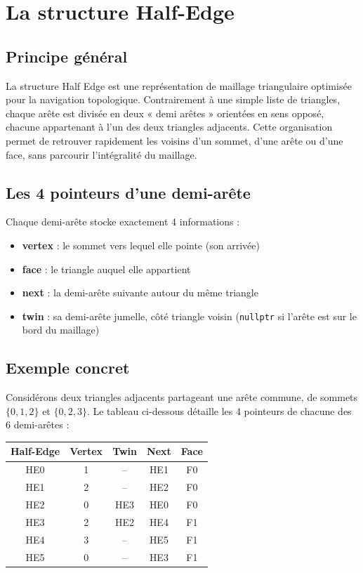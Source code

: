 \section{La structure Half-Edge}
\label{sec:halfedge}

\subsection{Principe général}
La structure Half Edge est une représentation de maillage triangulaire
optimisée pour la navigation topologique. Contrairement à une simple liste
de triangles, chaque arête est divisée en deux « demi arêtes » orientées
en sens opposé, chacune appartenant à l'un des deux triangles adjacents.
Cette organisation permet de retrouver rapidement les voisins d'un sommet,
d'une arête ou d'une face, sans parcourir l'intégralité du maillage.

\subsection{Les 4 pointeurs d'une demi-arête}
Chaque demi-arête stocke exactement 4 informations :
\begin{itemize}
	\item \textbf{vertex} : le sommet vers lequel elle pointe (son arrivée)
	\item \textbf{face} : le triangle auquel elle appartient
	\item \textbf{next} : la demi-arête suivante autour du même triangle
	\item \textbf{twin} : sa demi-arête jumelle, côté triangle voisin
	(\texttt{nullptr} si l'arête est sur le bord du maillage)
\end{itemize}

\subsection{Exemple concret}
Considérons deux triangles adjacents partageant une arête commune,
de sommets $\{0,1,2\}$ et $\{0,2,3\}$. Le tableau ci-dessous détaille
les 4 pointeurs de chacune des 6 demi-arêtes :

\begin{center}
	\begin{tabular}{|c|c|c|c|c|}
		\hline
		\textbf{Half-Edge} & \textbf{Vertex} & \textbf{Twin} & \textbf{Next} & \textbf{Face} \\
		\hline
		HE0 & 1 & -- & HE1 & F0 \\
		HE1 & 2 & -- & HE2 & F0 \\
		HE2 & 0 & HE3 & HE0 & F0 \\
		HE3 & 2 & HE2 & HE4 & F1 \\
		HE4 & 3 & -- & HE5 & F1 \\
		HE5 & 0 & -- & HE3 & F1 \\
		\hline
	\end{tabular}
\end{center}

